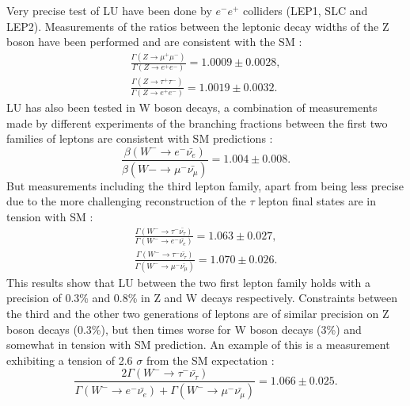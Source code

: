 Very precise test of LU have been done by $e^-e^+$ colliders (LEP1, SLC and LEP2). Measurements of the ratios between the leptonic decay widths of the Z boson have been performed and are consistent with the SM \cite{ALEPH:2005ab}:
\begin{align}
	\frac{\Gamma(Z\to\mu^+\mu^-)}{\Gamma(Z\to e^+e^-)}=1.0009\pm 0.0028,
	\\
	\frac{\Gamma(Z\to\tau^+\tau^-)}{\Gamma(Z\to e^+e^-)}=1.0019\pm 0.0032.
\end{align}
LU has also been tested in W boson decays, a combination of measurements made by different experiments of the branching fractions between the first two families of leptons are consistent with SM predictions \cite{Pich:2013lsa}:
\begin{equation}
\frac{\beta(W^-\to e^-\bar{\nu_e})}{\beta(W-\to \mu^-\bar{\nu_\mu})}=1.004\pm 0.008.
\end{equation}
But measurements including the third lepton family, apart from being less precise due to the more challenging reconstruction of the $\tau$ lepton final states are in tension with SM \cite{Schael:2013ita}:
\begin{align}
\frac{\Gamma(W^-\to\tau^-\bar{\nu_\tau})}{\Gamma(W^-\to e^-\bar{\nu_e})}=1.063\pm 0.027,
\\
\frac{\Gamma(W^-\to\tau^-\bar{\nu_\tau})}{\Gamma(W^-\to \mu^-\bar{\nu_\mu})}=1.070\pm 0.026.
\end{align}
This results show that LU between the two first lepton family holds with a precision of 0.3\% and 0.8\% in Z and W decays respectively. Constraints between the third and the other two generations of leptons are of similar precision on Z boson decays (0.3\%), but then times worse for W boson decays (3\%) and somewhat in tension with SM prediction. An example of this is a measurement exhibiting a tension of 2.6 $\sigma$ from the SM expectation \cite{Schael:2013ita}:
\begin{equation}
	\frac{2\Gamma(W^-\to\tau^-\bar{\nu_\tau})}{\Gamma(W^-\to e^-\bar{\nu_e})+\Gamma(W^-\to \mu^-\bar{\nu_\mu})}=1.066\pm 0.025.
\end{equation}  


